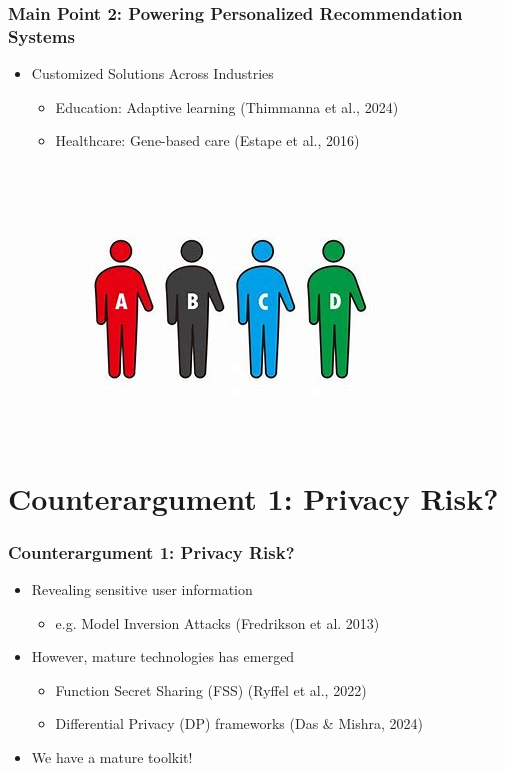 \documentclass{beamer}
\begin{document}
\begin{frame}
 \frametitle{Main Point 2: Powering Personalized Recommendation Systems}
\begin{minipage}{\textwidth}
{\linespread{1.3}
\begin{itemize}
    \item {\Large Customized Solutions Across Industries}
    \begin{itemize}
        \item <1-> {\large Education: Adaptive learning} (Thimmanna et al., 2024)
        \item <2-> {\large Healthcare: Gene-based care} (Estape et al., 2016)
    \end{itemize}
\end{itemize}
}
\begin{figure}
    \centering
    \includegraphics[width=0.45\linewidth]{figure 5.png}
    \label{fig:enter-label}
\end{figure}
\end{minipage}
\end{frame}



\section{Counterargument 1: Privacy Risk?}
\begin{frame}
 \frametitle{Counterargument 1: Privacy Risk?}
\begin{minipage}{\textwidth}
{\linespread{1.8}
\begin{itemize}
    \item <1-> {\Large Revealing sensitive user information}\\
    \begin{itemize}
        \item {\large e.g. Model Inversion Attacks} (Fredrikson et al. 2013)
    \end{itemize}
    \item <2-> {\Large However, mature technologies has emerged}
    \begin{itemize}
        \item {\large Function Secret Sharing (FSS)} (Ryffel et al., 2022)
        \item {\large Differential Privacy (DP) frameworks} (Das \& Mishra, 2024)
    \end{itemize}
    \item <3-> {\Large We have a mature toolkit!}
\end{itemize}
}

\end{minipage}
\end{frame}
\end{document}
